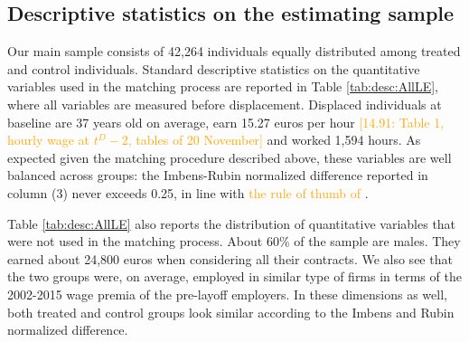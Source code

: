 \subsection{Descriptive statistics on the estimating sample} 
\label{sec:stat_desc}
Our main sample consists of 42,264 individuals equally distributed among treated and control individuals. Standard descriptive statistics on the quantitative variables used in the matching process are reported in Table \ref{tab:desc:AllLE}, where all variables are measured before displacement. Displaced individuals at baseline are 37 years old on average, earn 15.27 euros per hour \textcolor{orange}{[14.91: Table 1, hourly wage at $t^D-2$, tables of 20 November]} and worked 1,594 hours. As expected given the matching procedure described above, these variables are well balanced across groups: the Imbens-Rubin normalized difference reported in column (3) never exceeds 0.25, in line with \textcolor{orange}{the rule of thumb of \citet{rubin_assessing_2015}}. %

Table \ref{tab:desc:AllLE} also reports the distribution of quantitative variables that were not used in the matching process. About 60\% of the sample are males. They earned about 24,800 euros when considering all their contracts. We also see that the two groups were, on average, employed in similar type of firms in terms of the 2002-2015 wage premia of the pre-layoff employers. %
 In these dimensions as well, both treated and control groups look similar according to the Imbens and Rubin normalized difference. %

